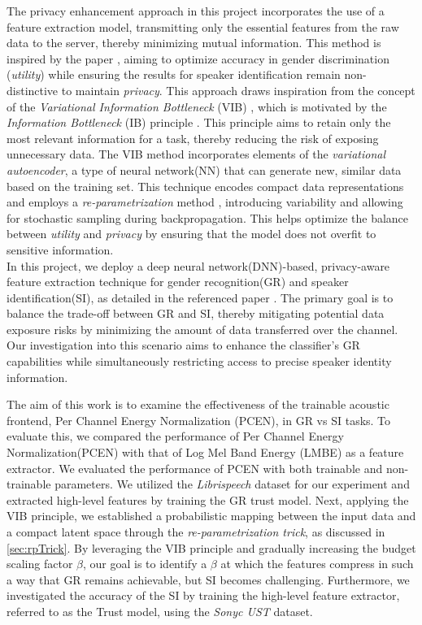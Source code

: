 The privacy enhancement approach in this project incorporates the use of a feature extraction model, transmitting only the essential features from the raw data to the server, thereby minimizing mutual information. This method is inspired by the paper \cite{nelus}, aiming to optimize accuracy in gender discrimination (\textit{utility}) while ensuring the results for speaker identification remain non-distinctive to maintain \textit{privacy}. This approach draws inspiration from the concept of the \textit{Variational Information Bottleneck} (VIB) \cite{alemi2017deep}, which is motivated by the \textit{Information Bottleneck} (IB) principle \cite{tishby2000information}. This principle aims to retain only the most relevant information for a task, thereby reducing the risk of exposing unnecessary data. The VIB method incorporates elements of the \textit{variational autoencoder}, a type of neural network(NN) that can generate new, similar data based on the training set. This technique encodes compact data representations and employs a \textit{re-parametrization} method \cite{kingma2013auto}, introducing variability and allowing for stochastic sampling during backpropagation. This helps optimize the balance between \textit{utility} and \textit{privacy} by ensuring that the model does not overfit to sensitive information.\\


In this project, we deploy a deep neural network(DNN)-based, privacy-aware feature extraction technique for gender recognition(GR) and speaker identification(SI), as detailed in the referenced paper \cite{nelus}. The primary goal is to balance the trade-off between GR and SI, thereby mitigating potential data exposure risks by minimizing the amount of data transferred over the channel. Our investigation into this scenario aims to enhance the classifier's GR capabilities while simultaneously restricting access to precise speaker identity information.

The aim of this work is to examine the effectiveness of the trainable acoustic frontend, Per Channel Energy Normalization (PCEN), in GR vs SI tasks. To evaluate this, we compared the performance of Per Channel Energy Normalization(PCEN) with that of Log Mel Band Energy (LMBE) as a feature extractor. We evaluated the performance of PCEN with both trainable and non-trainable parameters. We utilized the \textit{Librispeech} dataset for our experiment and extracted high-level features by training the GR trust model. Next, applying the VIB principle, we established a probabilistic mapping between the input data and a compact latent space through the \textit{re-parametrization trick}, as discussed in \cref{sec:rpTrick}. By leveraging the VIB principle and gradually increasing the budget scaling factor \( \beta \), our goal is to identify a \( \beta \) at which the features compress in such a way that GR remains achievable, but SI becomes challenging. Furthermore, we investigated the accuracy of the SI by training the high-level feature extractor, referred to as the Trust model, using the \textit{Sonyc UST} dataset.


